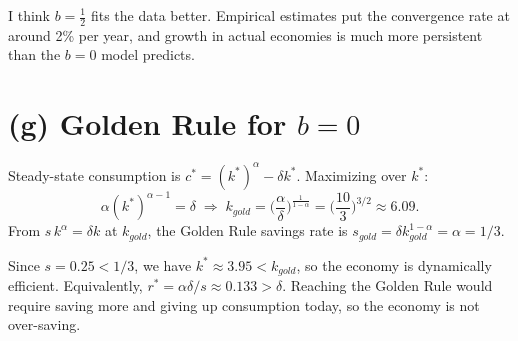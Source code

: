 \documentclass[11pt]{article}
\begin{document}
I think $b=\tfrac12$ fits the data better. Empirical estimates put the convergence rate at around 2\%
per year, and growth in actual economies is much more persistent than the $b=0$ model predicts.

\section*{(g) Golden Rule for $b=0$}

Steady-state consumption is $c^* = (k^*)^{\alpha} - \delta k^*$. Maximizing over $k^*$:
\[
\alpha (k^*)^{\alpha-1} = \delta
\;\Longrightarrow\;
k_{gold} = \Big(\frac{\alpha}{\delta}\Big)^{\frac{1}{1-\alpha}} = \Big(\frac{10}{3}\Big)^{3/2} \approx 6.09 .
\]
From $s\,k^{\alpha} = \delta k$ at $k_{gold}$, the Golden Rule savings rate is $s_{gold} = \delta k_{gold}^{1-\alpha} = \alpha = 1/3$.

Since $s = 0.25 < 1/3$, we have $k^* \approx 3.95 < k_{gold}$, so the economy is dynamically efficient.
Equivalently, $r^* = \alpha\delta/s \approx 0.133 > \delta$. Reaching the Golden Rule would require
saving more and giving up consumption today, so the economy is not over-saving.
\end{document}
